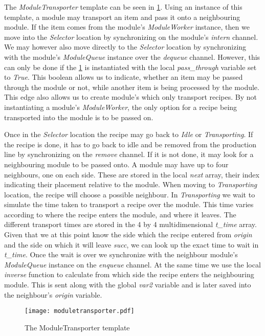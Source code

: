 The \emph{ModuleTransporter} template can be seen in \cref{fig:moduletransporter}. Using an instance of this template, a module may transport an item and pass it onto a neighbouring module. If the item comes from the module's \emph{ModuleWorker} instance, then we move into the \emph{Selector} location by synchronizing on the module's \emph{intern} channel. We may however also move directly to the \emph{Selector} location by synchronizing  with the module's \emph{ModuleQueue} instance over the \emph{dequeue} channel. However, this can only be done if the \cref{fig:moduletransporter} is instantiated with the local \emph{pass\_through} variable  set to \emph{True}. This boolean allows us to indicate, whether an item may be passed through the module or not, while another item is being processed by the module. This edge also allows us to create module's which only transport recipes. By not instantiating a module's \emph{ModuleWorker}, the only option for a recipe being transported into the module is to be passed on. 

Once in the \emph{Selector} location the recipe may go back to \emph{Idle} or \emph{Transporting}. If the recipe is done, it has to go back to idle and be removed from the production line by synchronizing on the \emph{remove} channel. If it is not done, it may look for a neighbouring module to be passed onto.  A module may have up to four neighbours, one on each side. These are stored in the local \emph{next} array, their index indicating their placement relative to the module. When moving to \emph{Transporting} location, the recipe will choose a possible neighbour. In \emph{Transporting} we wait to simulate the time taken to transport a recipe over the module. This time varies according to where the recipe enters the module, and where it leaves. The different transport times are stored in the 4 by 4 multidimensional \emph{t\_time} array. Given that we at this point know the side which the recipe entered from \emph{origin} and the side on which it will leave \emph{succ}, we can look up the exact time to wait in \emph{t\_time}. Once the wait is over we synchronize with the neighbour module's \emph{ModuleQueue} instance on the \emph{enqueue} channel. At the same time we use the local \emph{inverse} function to calculate from which side the recipe enters the neighbouring module. This is sent along with the global \emph{var2} variable and is later saved into the neighbour's \emph{origin} variable. 


\begin{figure}[h]
\centering
\texttt{[image: moduletransporter.pdf]}
\caption{The ModuleTransporter template}
\label{fig:moduletransporter}
\end{figure}